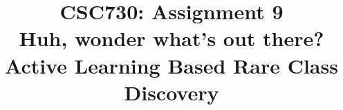 \documentclass[conference]{IEEEtran}
\begin{document}
\title{CSC730: Assignment 9\\Huh, wonder what’s out there?\\Active Learning Based Rare
Class Discovery}

\maketitle




\printbibliography{}

\vspace{12pt}
\end{document}
